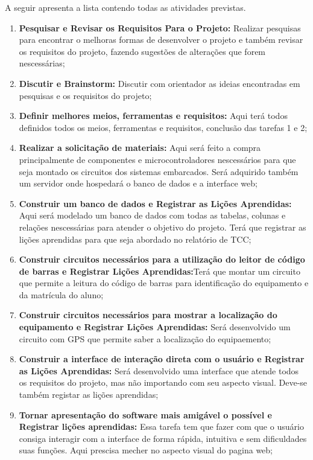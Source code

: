 \vspace{-42pt}

A seguir apresenta a lista contendo todas as atividades previstas.

\begin{enumerate}
	\item \textbf{Pesquisar e Revisar os Requisitos Para o Projeto:} Realizar pesquisas para encontrar o melhoras formas de desenvolver o projeto e também revisar os requisitos do projeto, fazendo sugestões de alterações que forem nescessárias;
	\item  \textbf{Discutir e Brainstorm:} Discutir com orientador as ideias encontradas em pesquisas e os requisitos do projeto;
	\item \textbf{Definir melhores meios, ferramentas e requisitos:} Aqui terá todos definidos todos os meios, ferramentas e requisitos, conclusão das tarefas 1 e 2;
	\item \textbf{Realizar a solicitação de materiais:} Aqui será feito a compra principalmente de componentes e microcontroladores nescessários para que seja montado os circuitos dos sistemas embarcados. Será adquirido também um servidor onde hospedará o banco de dados e a interface web;
	\item \textbf{Construir um banco de dados e Registrar as Lições Aprendidas:} Aqui será modelado um banco de dados com todas as tabelas, colunas e relações nescessárias para atender o objetivo do projeto. Terá que registrar as lições aprendidas para que seja abordado no relatório de TCC;
	\item \textbf{Construir circuitos necessários para a utilização do leitor de código de barras e Registrar Lições Aprendidas:}Terá que montar um circuito que permite a leitura do código de barras para identificação do equipamento e da matrícula do aluno;
	\item \textbf{Construir circuitos necessários para mostrar a localização do equipamento e Registrar Lições Aprendidas:} Será desenvolvido um circuito com GPS que permite saber a localização do equipaemento;
	\item \textbf{Construir a interface de interação direta com o usuário e Registrar as Lições Aprendidas:} Será desenvolvido uma interface que atende todos os requisitos do projeto, mas não importando com seu aspecto visual. Deve-se também registar as lições aprendidas;
	\item \textbf{Tornar apresentação do software mais amigável o possível e Registrar lições aprendidas:} Essa tarefa tem que fazer com que  o usuário consiga interagir com a interface de forma rápida, intuitiva e sem dificuldades suas funções. Aqui prescisa mecher no aspecto visual do pagina web; 

\end{enumerate}
